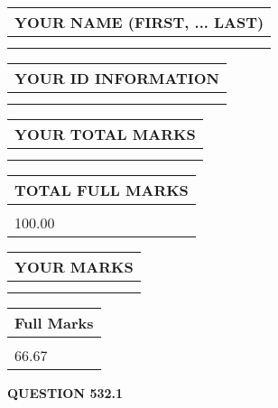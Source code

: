 \documentclass{ctexart}
\begin{document}
   
   
   
\newpage 
\setcounter{page}{ 
   532001 } 
   
   
   
   
\noindent\begin{tabular}{|l|}
\hline
YOUR NAME (FIRST, ... LAST)  \\
\hline
 \\ 
 \\ 
\hline
\end{tabular}
\hspace{0.05in} \begin{tabular}{|l|}
\hline
 YOUR   ID   INFORMATION  \\
\hline
 \\ 
 \\ 
\hline
\end{tabular}
   
   
\vspace{0.2in}\noindent\begin{tabular}{|l|}
\hline
YOUR TOTAL MARKS  \\
\hline
 \\ 
 \\ 
\hline
\end{tabular}
\hspace{0.05in} \begin{tabular}{|l|}
\hline
TOTAL FULL MARKS  \\
\hline
 \\ 
100.00 \\
\hline
\end{tabular}
   
   
 \vspace{0.2in}
 
 
 
 
   
   
  
\vspace{0.2in}
  
\noindent\begin{tabular}{|l|}
\hline
 YOUR MARKS  \\
\hline
 \\ 
 \\ 
\hline
\end{tabular}
\hspace{0.05in} \begin{tabular}{|l|}
\hline
 Full Marks  \\
\hline
 \\ 
66.67 \\
\hline
\end{tabular}
{\textbf{\Large{QUESTION
532.1 
}}}
  
\end{document}
